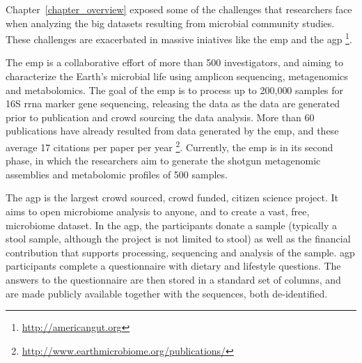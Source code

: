 \documentclass[12pt,chapterheads]{ucsd}
\begin{document}
Chapter~\ref{chapter_overview} exposed some of the challenges that researchers
face when analyzing the big datasets resulting from microbial community
studies. These challenges are exacerbated in massive iniatives like
the \gls{emp} \cite{Gilbert2010, Gilbert2014, Thompson2017} and the \gls{agp}
\footnote{\url{http://americangut.org}}.

The \gls{emp} is a collaborative effort of more than 500 investigators, and aiming
to characterize the Earth's microbial life using amplicon sequencing,
metagenomics and metabolomics. The goal of the \gls{emp} is to process up to 200,000
samples for 16S \gls{rrna} marker gene sequencing, releasing the data as the data are
generated prior to publication and
crowd sourcing the data analysis. More than 60 publications have already resulted
from data generated by the \gls{emp}, and these average 17 citations per paper per year
\footnote{\label{emppuburl}\url{http://www.earthmicrobiome.org/publications/}}.
Currently, the \gls{emp} is in its second phase, in which the researchers aim to
generate the shotgun metagenomic assemblies and metabolomic profiles of 500 samples.

The \gls{agp} is the largest crowd sourced, crowd funded, citizen science project. It aims to
open microbiome analysis to anyone, and to create a vast, free, microbiome dataset.
In the \gls{agp}, the participants donate a sample (typically a stool sample,
although the project is not limited to stool) as well as the financial contribution
that supports processing, sequencing and analysis of the sample. \gls{agp} participants complete a
questionnaire with dietary and lifestyle questions. The answers to the
questionnaire are then stored in a standard set of columns, and are
made publicly available together with the sequences, both de-identified.
\end{document}
